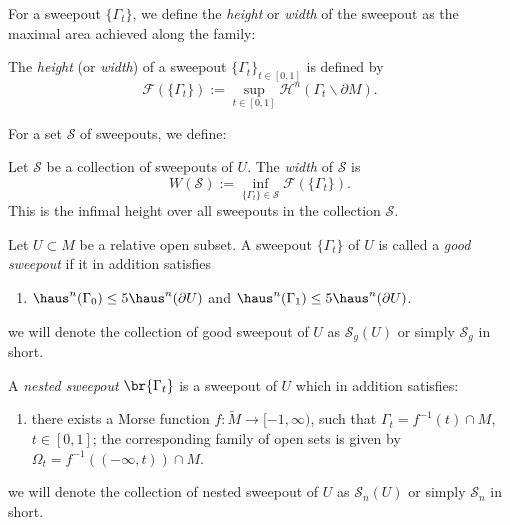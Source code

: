 For a sweepout $\{\Gamma_t\}$, we define the \emph{height} or \emph{width} of the sweepout as the maximal area achieved along the family:

\begin{definition}\label{def:height}
The \emph{height} (or \emph{width}) of a sweepout $\{\Gamma_t\}_{t \in [0,1]}$ is defined by
\begin{equation*}
    \mathcal{F}(\{\Gamma_t\}) := \sup_{t \in [0,1]} \mathcal{H}^n(\Gamma_t\backslash\partial M).
\end{equation*}
\end{definition}


For a set $\mathcal{S}$ of sweepouts, we define:
\begin{definition}\label{def:width-collection}
Let $\mathcal{S}$ be a collection of sweepouts of $U$. The \emph{width} of $\mathcal{S}$ is
\begin{equation*}
    W(\mathcal{S}) := \inf_{\{\Gamma_t\} \in \mathcal{S}} \mathcal{F}(\{\Gamma_t\}).
\end{equation*}
This is the infimal height over all sweepouts in the collection $\mathcal{S}$.
\end{definition}

\begin{definition}\label{def:good-sweepout}
Let $U \subset M$ be a relative open subset. A sweepout $\{\Gamma_t\}$ of $U$ is
called a \emph{good sweepout} if it in addition satisfies
\begin{enumerate}
    \item[($\text{sw}_g$)] $\haus^n(\Gamma_0) \leq 5\haus^n(\partial U)$ and $\haus^n(\Gamma_1) \leq 5\haus^n(\partial U)$.
\end{enumerate}
we will denote the collection of good sweepout of $U$ as $\mathcal{S}_g(U)$ or simply $\mathcal{S}_g$ in short.
\end{definition}
\begin{definition}\label{def:nested-sweepout}
A \emph{nested sweepout} $\br{\Gamma_t}$ is a sweepout of $U$ which in addition satisfies:
\begin{enumerate}
    \item[($\text{sw}_n$)] there exists a Morse function $f: \widetilde{M} \to [-1, \infty)$, such that $\Gamma_t = f^{-1}(t)\cap M$, $t \in [0, 1]$; the corresponding family of open sets is given by $\Omega_t = f^{-1}((-\infty, t))\cap M$.
\end{enumerate}
we will denote the collection of nested sweepout of $U$ as $\mathcal{S}_n(U)$ or simply $\mathcal{S}_n$ in short.
\end{definition}

